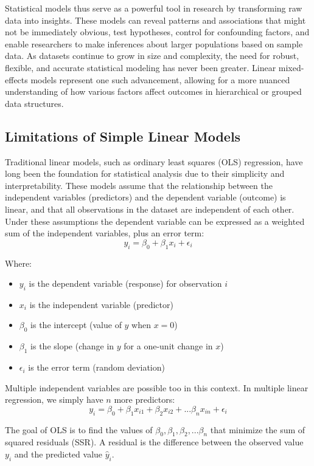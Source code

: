 Statistical models thus serve as a powerful tool in research by transforming raw data into insights. These models can reveal patterns and associations that might not be immediately obvious, test hypotheses, control for confounding factors, and enable researchers to make inferences about larger populations based on sample data. As datasets continue to grow in size and complexity, the need for robust, flexible, and accurate statistical modeling has never been greater. Linear mixed-effects models represent one such advancement, allowing for a more nuanced understanding of how various factors affect outcomes in hierarchical or grouped data structures.

\subsection*{Limitations of Simple Linear Models}
Traditional linear models, such as ordinary least squares (OLS) regression, have long been the foundation for statistical analysis due to their simplicity and interpretability. These models assume that the relationship between the independent variables (predictors) and the dependent variable (outcome) is linear, and that all observations in the dataset are independent of each other. Under these assumptions the dependent variable can be expressed as a weighted sum of the independent variables, plus an error term:
\[
y_i = \beta_0 + \beta_1 x_i + \epsilon_i
\]

\noindent Where:
\begin{itemize}
\item $y_{i}$ is the dependent variable (response) for observation $i$
\item $x_{i}$ is the independent variable (predictor)
\item $\beta_0$  is the intercept (value of $y$ when $x=0$)
\item $\beta_1$ is the slope (change in $y$ for a one-unit change in $x$)
\item $\epsilon_i$ is the error term (random deviation)
\end{itemize}

Multiple independent variables are possible too in this context. In multiple linear regression, we simply have $n$ more predictors:
\[
y_i = \beta_0 + \beta_1 x_{i1} + \beta_2 x_{i2} + ... \beta_n x_{in} + \epsilon_i
\]

 The goal of OLS is to find the values of $\beta_0, \beta_1, \beta_2, ... \beta_n$ that minimize the sum of squared residuals (SSR). A residual is the difference between the observed value $y_i$ and the predicted value $\hat{y}_i$.
 

